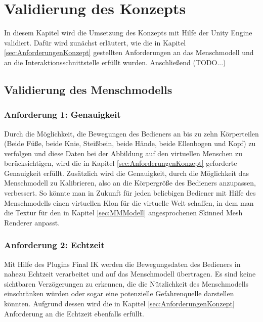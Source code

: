 \chapter{Validierung des Konzepts}\label{cha:ValidierungDesKonzepts}
In diesem Kapitel wird die Umsetzung des Konzepts mit Hilfe der Unity Engine validiert. Dafür wird zunächst erläutert, wie die in Kapitel \ref{sec:AnforderungenKonzept} gestellten Anforderungen an das Menschmodell und an die Interaktionsschnittstelle erfüllt wurden. Anschließend (TODO...)
\section{Validierung des Menschmodells}\label{sec:ValidMensch}

\subsection{Anforderung 1: Genauigkeit}
Durch die Möglichkeit, die Bewegungen des Bedieners an bis zu zehn Körperteilen (Beide Füße, beide Knie, Steißbein, beide Hände, beide Ellenbogen und Kopf) zu verfolgen und diese Daten bei der Abbildung auf den virtuellen Menschen zu berücksichtigen, wird die in Kapitel \ref{sec:AnforderungenKonzept} geforderte Genauigkeit erfüllt. Zusätzlich wird die Genauigkeit, durch die Möglichkeit das Menschmodell zu Kalibrieren, also an die Körpergröße des Bedieners anzupassen, verbessert. So könnte man in Zukunft für jeden beliebigen Bediener mit Hilfe des Menschmodells einen virtuellen Klon für die virtuelle Welt schaffen, in dem man die Textur für den in Kapitel \ref{sec:MMModell} angesprochenen Skinned Mesh Renderer anpasst.

\subsection{Anforderung 2: Echtzeit}
Mit Hilfe des Plugins Final IK werden die Bewegungsdaten des Bedieners in nahezu Echtzeit verarbeitet und auf das Menschmodell übertragen. Es sind keine sichtbaren Verzögerungen zu erkennen, die die Nützlichkeit des Menschmodells einschränken würden oder sogar eine potenzielle Gefahrenquelle darstellen könnten. Aufgrund dessen wird die in Kapitel \ref{sec:AnforderungenKonzept} Anforderung an die Echtzeit ebenfalls erfüllt.

